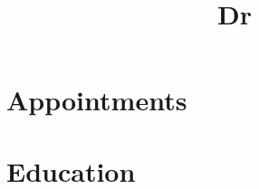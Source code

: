 \documentclass[11pt,a4paper]{article}
\title{Dr}
\begin{document}
\makeheader
\bigskip
\bigskip

\section*{Appointments}%


\section*{Education}%

 
\begin{publications}
%
%
%
%
%
%
%  
%
%
%
%
\end{publications}
\end{document}
